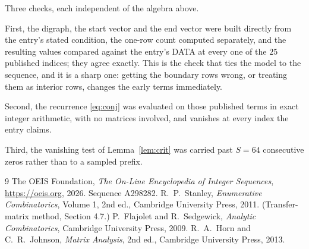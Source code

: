 \documentclass[11pt,a4paper]{article}
\theoremstyle{plain}
\theoremstyle{definition}
\begin{document}
Three checks, each independent of the algebra above.

First, the digraph, the start vector and the end vector were built directly from the
entry's stated condition, the one-row count computed separately, and the resulting values
compared against the entry's DATA at every one of the $25$ published indices; they
agree exactly. This is the check that ties the model to the sequence, and it is a sharp one:
getting the boundary rows wrong, or treating them as interior rows, changes the early terms
immediately.

Second, the recurrence \eqref{eq:conj} was evaluated on those published terms in exact
integer arithmetic, with no matrices involved, and vanishes at every index the entry claims.

Third, the vanishing test of Lemma~\ref{lem:crit} was carried past $S=64$ consecutive
zeros rather than to a sampled prefix.

\begin{thebibliography}{9}
 The OEIS Foundation, \emph{The On-Line Encyclopedia of Integer
Sequences}, \url{https://oeis.org}, 2026. Sequence A298282.
 R.~P.~Stanley, \emph{Enumerative Combinatorics}, Volume 1, 2nd ed.,
Cambridge University Press, 2011. (Transfer-matrix method, Section 4.7.)
 P.~Flajolet and R.~Sedgewick, \emph{Analytic Combinatorics}, Cambridge
University Press, 2009.
 R.~A.~Horn and C.~R.~Johnson, \emph{Matrix Analysis}, 2nd ed., Cambridge
University Press, 2013.
\end{thebibliography}
\end{document}
